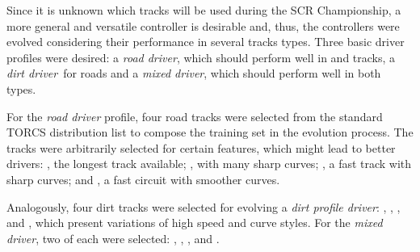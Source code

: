 \newcommand{\profile}[1]{\emph{#1 driver}}%
Since it is unknown which tracks will be used during the SCR Championship, a more general and versatile controller is desirable and, thus, the controllers were evolved considering their performance in several tracks types. Three basic driver profiles were desired: a \profile{road}, which should perform well in  and  tracks, a \profile{dirt}~for  roads and a \profile{mixed}, which should perform well in both types.

For the \profile{road} profile, four road tracks were selected from the standard TORCS distribution list to compose the training set in the evolution process. The tracks were arbitrarily selected for certain features, which might lead to better drivers: , the longest track available; , with many sharp curves; , a fast track with sharp curves; and , a fast circuit with smoother curves.

Analogously, four dirt tracks were selected for evolving a \profile{dirt profile}: , , , and , which present variations of high speed and curve styles. For the \profile{mixed}, two of each were selected: , , , and .

